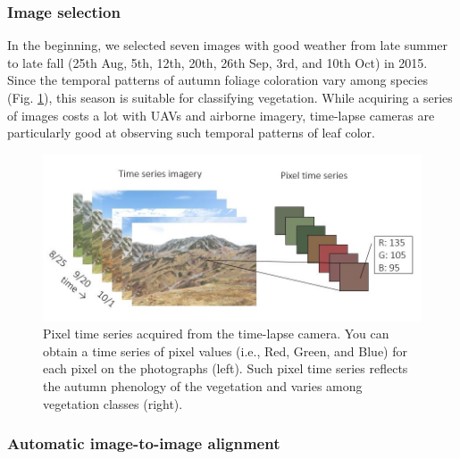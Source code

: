 \documentclass{article}
\begin{document}
\hypertarget{image-selection}{%
\subsubsection{Image selection}\label{image-selection}}

In the beginning, we selected seven images with good weather from late summer to late fall (25th Aug, 5th, 12th, 20th, 26th Sep, 3rd, and 10th Oct) in 2015. Since the temporal patterns of autumn foliage coloration vary among species (Fig. \ref{fig:pixtimeseries}), this season is suitable for classifying vegetation. While acquiring a series of images costs a lot with UAVs and airborne imagery, time-lapse cameras are particularly good at observing such temporal patterns of leaf color.



\begin{figure}
\includegraphics[width=1\linewidth]{paper_files/figures/Slide1} \caption{Pixel time series acquired from the time-lapse camera. You can obtain a time series of pixel values (i.e., Red, Green, and Blue) for each pixel on the photographs (left). Such pixel time series reflects the autumn phenology of the vegetation and varies among vegetation classes (right).}\label{fig:pixtimeseries}
\end{figure}

\hypertarget{automatic-image-to-image-alignment}{%
\subsubsection{Automatic image-to-image alignment}\label{automatic-image-to-image-alignment}}
\end{document}
